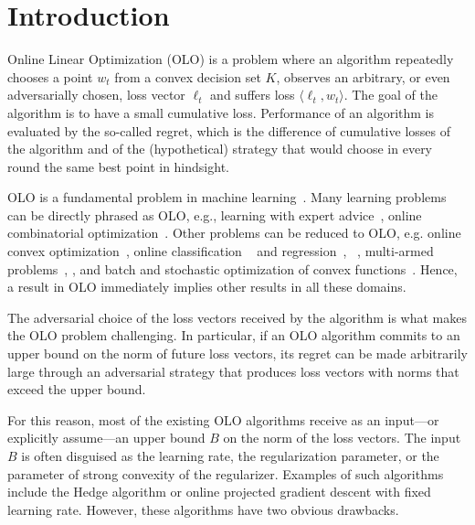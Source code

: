 \section{Introduction}
\label{section:introduction}

Online Linear Optimization (OLO) is a problem where an algorithm repeatedly
chooses a point $w_t$ from a convex decision set $K$, observes an arbitrary, or
even adversarially chosen, loss vector $\ell_t$ and suffers loss $\langle
\ell_t, w_t \rangle$.  The goal of the algorithm is to have a small cumulative
loss. Performance of an algorithm is evaluated by the so-called regret, which
is the difference of cumulative losses of the algorithm and of the
(hypothetical) strategy that would choose in every round the same best point in
hindsight.

OLO is a fundamental problem in machine
learning~\cite{Cesa-Bianchi-Lugosi-2006, Rakhlin-Sridharan-2009,
Shalev-Shwartz-2011}.  Many learning problems can be directly phrased as OLO,
e.g., learning with expert advice~\cite{Littlestone-Warmuth-1994, Vovk-1998,
Freund-Schapire-1997, Cesa-Bianchi-Haussler-Helmbold-Schapire-Warmuth-1997},
online combinatorial optimization~\cite{Kalai-Vempala-2005,
Helmbold-Warmuth-2009, Koolen-Warmuth-Kivinen-2010}. Other problems can be
reduced to OLO, e.g. online convex
optimization~\cite[Chapter~2]{Shalev-Shwartz-2011}, online classification
~\cite{Rosenblatt-1958,Freund-Schapire-1999} and
regression~\cite{Kivinen-Warmuth-1997},
~\cite[Chapters~11~and~12]{Cesa-Bianchi-Lugosi-2006}, multi-armed
problems~\cite[Chapter~6]{Cesa-Bianchi-Lugosi-2006},
\cite{Bubeck-Cesa-Bianchi-2012}, and batch and stochastic optimization of
convex functions~\cite{Nemirovski-Yudin-1983, Bubeck-2015}.  Hence, a result in
OLO immediately implies other results in all these domains.

The adversarial choice of the loss vectors received by the algorithm is what
makes the OLO problem challenging. In particular, if an OLO algorithm commits
to an upper bound on the norm of future loss vectors, its regret can be made
arbitrarily large through an adversarial strategy that produces loss vectors
with norms that exceed the upper bound.

For this reason, most of the existing OLO algorithms receive as an input---or
explicitly assume---an upper bound $B$ on the norm of the loss vectors.  The
input $B$ is often disguised as the learning rate, the regularization
parameter, or the parameter of strong convexity of the regularizer. Examples of
such algorithms include the Hedge algorithm or online projected gradient
descent with fixed learning rate.  However, these algorithms have two obvious
drawbacks.

